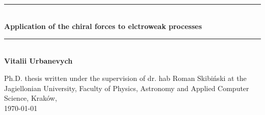 \documentclass[oneside,a4paper,openright]{report}
\newcommand{\HRule}{\rule{\linewidth}{0.5mm}}
\begin{document}
\newpage

\begin{titlepage}
\begin{center}

~\\[5cm]

\HRule \\[0.4cm]
{ 
\huge \bfseries 
Application of the chiral forces to elctroweak processes
\\[0.4cm] 
}
\HRule \\[0.4cm]
{
\LARGE
\bfseries
Vitalii Urbanevych
}
\vfill

{
\large
Ph.D. thesis written under the supervision of dr. hab Roman Skibi\'nski \newline at the Jagiellonian University,
Faculty of Physics, Astronomy \newline and Applied Computer Science, Krak\'ow,
}
\\
{
\large \today
}


\end{center}
\end{titlepage}
\end{document}
